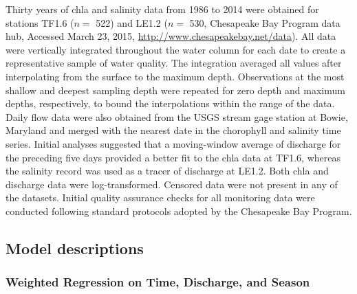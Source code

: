 \documentclass{svjour3}\usepackage[]{graphicx}\usepackage[]{color}
\begin{document}

Thirty years of \ac{chla} and salinity data from 1986 to 2014 were obtained for stations TF1.6 ($n = $ 522) and LE1.2 ($n =$ 530, Chesapeake Bay Program data hub, Accessed March 23, 2015, \href{http://www.chesapeakebay.net/data}{http://www.chesapeakebay.net/data}).  All data were vertically integrated throughout the water column for each date to create a representative sample of water quality.  The integration averaged all values after interpolating from the surface to the maximum depth. Observations at the most shallow and deepest sampling depth were repeated for zero depth and maximum depths, respectively, to bound the interpolations within the range of the data.  Daily flow data were also obtained from the \ac{USGS} stream gage station at Bowie, Maryland and merged with the nearest date in the chorophyll and salinity time series.  Initial analyses suggested that a moving-window average of discharge for the preceding five days provided a better fit to the \ac{chla} data at TF1.6, whereas the salinity record was used as a tracer of discharge at LE1.2.  Both \ac{chla} and discharge data were log-transformed.  Censored data were not present in any of the datasets.  Initial quality assurance checks for all monitoring data were conducted following standard protocols adopted by the Chesapeake Bay Program.        

\subsection{Model descriptions}

\subsubsection{Weighted Regression on Time, Discharge, and Season}
\end{document}

